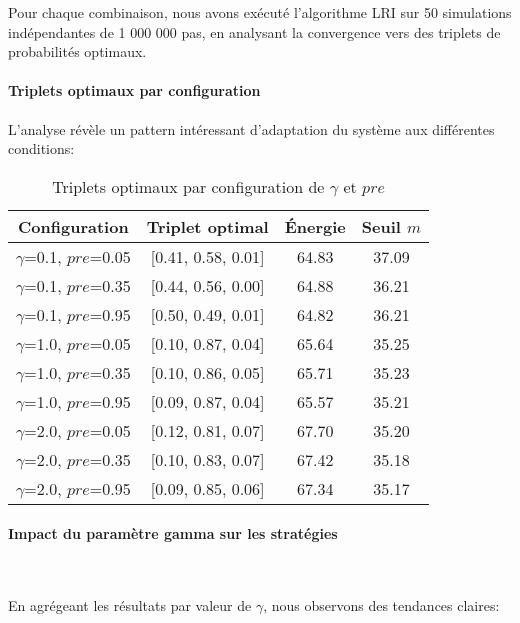 Pour chaque combinaison, nous avons exécuté l'algorithme LRI sur 50 simulations indépendantes de 1 000 000 pas, en analysant la convergence vers des triplets de probabilités optimaux.

\paragraph{Triplets optimaux par configuration}

L'analyse révèle un pattern intéressant d'adaptation du système aux différentes conditions:

\begin{table}[h]
\centering
\footnotesize
\setlength{\tabcolsep}{4pt}
\begin{tabular}{|c|c|c|c|}
\hline
\textbf{Configuration} & \textbf{Triplet optimal} & \textbf{Énergie} & \textbf{Seuil $m$} \\
\hline
$\gamma$=0.1, $pre$=0.05 & [0.41, 0.58, 0.01] & 64.83 & 37.09 \\
\hline
$\gamma$=0.1, $pre$=0.35 & [0.44, 0.56, 0.00] & 64.88 & 36.21 \\
\hline
$\gamma$=0.1, $pre$=0.95 & [0.50, 0.49, 0.01] & 64.82 & 36.21 \\
\hline
$\gamma$=1.0, $pre$=0.05 & [0.10, 0.87, 0.04] & 65.64 & 35.25 \\
\hline
$\gamma$=1.0, $pre$=0.35 & [0.10, 0.86, 0.05] & 65.71 & 35.23 \\
\hline
$\gamma$=1.0, $pre$=0.95 & [0.09, 0.87, 0.04] & 65.57 & 35.21 \\
\hline
$\gamma$=2.0, $pre$=0.05 & [0.12, 0.81, 0.07] & 67.70 & 35.20 \\
\hline
$\gamma$=2.0, $pre$=0.35 & [0.10, 0.83, 0.07] & 67.42 & 35.18 \\
\hline
$\gamma$=2.0, $pre$=0.95 & [0.09, 0.85, 0.06] & 67.34 & 35.17 \\
\hline
\end{tabular}
\caption{Triplets optimaux par configuration de $\gamma$ et $pre$}
\label{tab:triplets_gamma_pre}
\end{table}

\paragraph{Impact du paramètre gamma sur les stratégies}\

En agrégeant les résultats par valeur de $\gamma$, nous observons des tendances claires:

